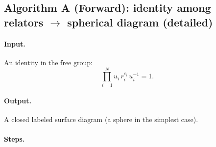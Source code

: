 \documentclass[11pt]{article}
\theoremstyle{definition}
\theoremstyle{plain}
\theoremstyle{remark}
\begin{document}
\subsection*{Algorithm A (Forward): identity among relators $\to$ spherical diagram (detailed)}\cite{gersten1987,lyndonschupp1977}
\paragraph{Input.} An identity in the free group:
\[
\prod_{i=1}^N u_i\, r_i^{\varepsilon_i}\,u_i^{-1}=1.
\]
\paragraph{Output.} A closed labeled surface diagram (a sphere in the simplest case).

\paragraph{Steps.}
\end{document}
